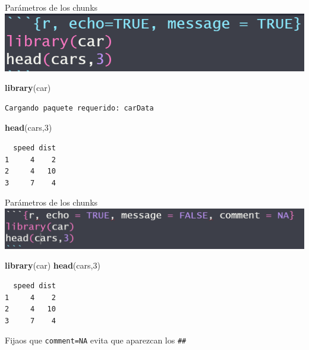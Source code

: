 \documentclass[
  ignorenonframetext,
]{beamer}
\newenvironment{Shaded}{\begin{snugshade}}{\end{snugshade}}
\newcommand{\DecValTok}[1]{\textcolor[rgb]{0.00,0.00,0.81}{#1}}
\newcommand{\FunctionTok}[1]{\textcolor[rgb]{0.13,0.29,0.53}{\textbf{#1}}}
\newcommand{\NormalTok}[1]{#1}
\begin{document}
\begin{frame}[fragile]{Parámetros de los chunks}
\label{paruxe1metros-de-los-chunks-4}
\includegraphics[width=0.6\linewidth]{Imgs/parametros_chunk_2}

\begin{Shaded}
\begin{Highlighting}[]
\FunctionTok{library}\NormalTok{(car)}
\end{Highlighting}
\end{Shaded}

\begin{verbatim}
Cargando paquete requerido: carData
\end{verbatim}

\begin{Shaded}
\begin{Highlighting}[]
\FunctionTok{head}\NormalTok{(cars,}\DecValTok{3}\NormalTok{)}
\end{Highlighting}
\end{Shaded}

\begin{verbatim}
  speed dist
1     4    2
2     4   10
3     7    4
\end{verbatim}
\end{frame}

\begin{frame}[fragile]{Parámetros de los chunks}
\label{paruxe1metros-de-los-chunks-5}
\includegraphics[width=0.6\linewidth]{Imgs/para_chunks_3}

\begin{Shaded}
\begin{Highlighting}[]
\FunctionTok{library}\NormalTok{(car)}
\FunctionTok{head}\NormalTok{(cars,}\DecValTok{3}\NormalTok{)}
\end{Highlighting}
\end{Shaded}

\begin{verbatim}
  speed dist
1     4    2
2     4   10
3     7    4
\end{verbatim}

Fijaos que \texttt{comment=NA} evita que aparezcan los \texttt{\#\#}
\end{frame}
\end{document}
